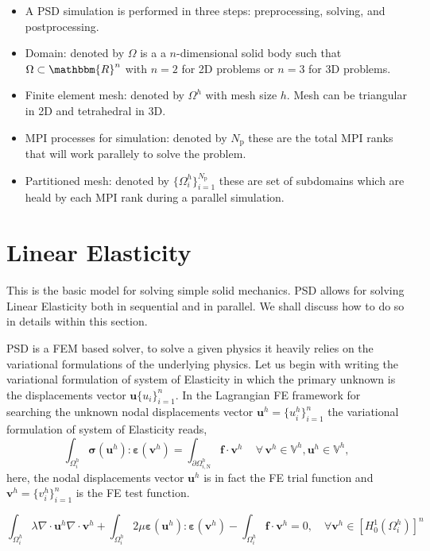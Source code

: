 \documentclass{report}
\newcommand{\bu}{\textbf{u}}
\newcommand{\buh}{\boldsymbol u^h}
\newcommand{\bvh}{\boldsymbol v^h}
\newcommand{\np}{N_\text{p}}
\newcommand{\sig}{\boldsymbol{\sigma}}
\newcommand{\eps}{\boldsymbol{\varepsilon}}
\begin{document}
\begin{itemize}
    \item A PSD simulation is performed in three steps: preprocessing, solving, and postprocessing. 
    \item Domain: denoted by $\Omega$ is a a $n$-dimensional solid body such that $\Omega \subset \mathbbm{R}^n$ with $n=2$   for 2D problems or  $n=3$ for 3D problems.
    \item Finite element mesh: denoted by $\Omega^h$ with mesh size $h$. Mesh can be triangular in 2D and tetrahedral in 3D.
    \item MPI processes for simulation: denoted by $\np$ these are the total MPI ranks that will work parallely to solve the problem.
    \item Partitioned mesh: denoted by $\{ \Omega ^h_i \}_{i=1}^{\np}$ these are set of subdomains which are heald by each MPI rank during a parallel simulation.
\end{itemize}

\section{Linear Elasticity}
This is the basic model for solving simple solid mechanics. PSD allows for solving Linear Elasticity both in sequential and in parallel. We shall discuss how to do so in details within this section.


PSD is a FEM based solver, to solve a given physics it heavily relies on the variational formulations of the underlying physics. Let us begin with writing the variational formulation of system of  Elasticity in which the primary unknown is the displacements vector $\bu\{u_i\}^n_{i=1}$. In the Lagrangian FE framework for searching the unknown nodal displacements vector $\bu^h=\{u^h_i\}^n_{i=1}$ the variational formulation of system of  Elasticity reads,
%
%
\begin{equation}\label{Eq:VarfU}
\int_{\Omega^h_i}\sig(\buh) : \eps(\bvh) = \int_{\partial\Omega^h_{i,\text{N}}} \mathbf{f}\cdot\bvh \, \quad\forall\,\bvh\in\mathbb{V}^h,\buh\in\mathbb{V}^h,
\end{equation}
%
here, the nodal displacements vector $\buh$ is in fact the FE trial function and $\bvh=\{v^h_i\}^n_{i=1}$ is the FE test function.

\begin{equation}\label{Eq:LinearElasticity}
\int_{\Omega^h_i}\lambda\nabla\cdot\buh\nabla\cdot\bvh + \int_{\Omega^h_i}2\mu\boldsymbol\varepsilon(\buh):\boldsymbol\varepsilon(\bvh)-\int_{\Omega^h_i}\mathbf{f}\cdot\bvh=0, \quad\forall\bvh\in[H^1_0(\Omega^h_i)]^n 
\end{equation}
\end{document}
